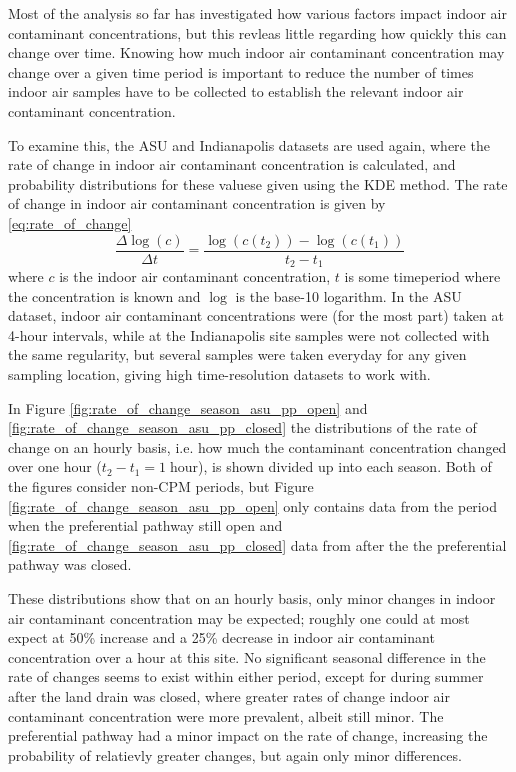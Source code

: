 \documentclass[journal=esthag,manuscript=article]{achemso}
\begin{document}
Most of the analysis so far has investigated how various factors impact indoor air contaminant concentrations, but this revleas little regarding how quickly this can change over time.
Knowing how much indoor air contaminant concentration may change over a given time period is important to reduce the number of times indoor air samples have to be collected to establish the relevant indoor air contaminant concentration. \par

To examine this, the ASU and Indianapolis datasets are used again, where the rate of change in indoor air contaminant concentration is calculated, and probability distributions for these valuese given using the KDE method.
The rate of change in indoor air contaminant concentration is given by \eqref{eq:rate_of_change}
\begin{equation}
  \frac{\Delta\log{(c)}}{\Delta t} = \frac{\log{(c(t_2))} - \log{(c(t_1))}}{t_2 - t_1} \label{eq:rate_of_change}
\end{equation}
where $c$ is the indoor air contaminant concentration, $t$ is some timeperiod where the concentration is known and $\log$ is the base-10 logarithm.
In the ASU dataset, indoor air contaminant concentrations were (for the most part) taken at 4-hour intervals\cite{holton_long-term_2015}, while at the Indianapolis site samples were not collected with the same regularity, but several samples were taken everyday for any given sampling location\cite{u.s._environmental_protection_agency_assessment_2015}, giving high time-resolution datasets to work with.

In Figure \ref{fig:rate_of_change_season_asu_pp_open} and \ref{fig:rate_of_change_season_asu_pp_closed} the distributions of the rate of change on an hourly basis, i.e. how much the contaminant concentration changed over one hour ($t_2 - t_1 = 1 \; \mathrm{hour}$), is shown divided up into each season.
Both of the figures consider non-CPM periods, but Figure \ref{fig:rate_of_change_season_asu_pp_open} only contains data from the period when the preferential pathway still open and \ref{fig:rate_of_change_season_asu_pp_closed} data from after the the preferential pathway was closed.

These distributions show that on an hourly basis, only minor changes in indoor air contaminant concentration may be expected; roughly one could at most expect at 50\% increase and a 25\% decrease in indoor air contaminant concentration over a hour at this site.
No significant seasonal difference in the rate of changes seems to exist within either period, except for during summer after the land drain was closed, where greater rates of change indoor air contaminant concentration were more prevalent, albeit still minor.
The preferential pathway had a minor impact on the rate of change, increasing the probability of relatievly greater changes, but again only minor differences.
\end{document}
